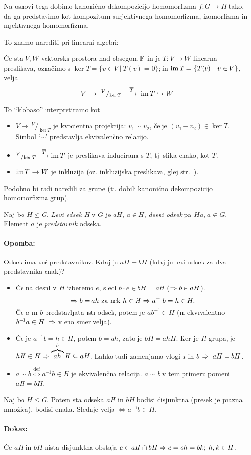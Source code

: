 \ni Na osnovi tega dobimo kanoni\v cno dekompozicijo homomorfizma $f : G \to H$ tako, da ga predstavimo kot kompozitum surjektivnega homomorfizma, izomorfizma
in injektivnega homomorfizma.

\ni To znamo narediti pri linearni algebri:
\begin{trditev}
	\v Ce sta $V, W$ vektorska prostora nad obsegom $\mathbb{F}$ in je $T : V\to W$ linearna preslikava, ozna\v cimo s $\ker T = \{v \in V\ |\ T(v) = 0\}$; in
	$\operatorname{im} T = \{T(v)\ |\ v\in V\}$, velja
	\[
		V\ \to\ ^V/_{\ker T}\ \stackrel{\overline{T}}{\longrightarrow}\ \im T \hookrightarrow W
	\]
\end{trditev}

To "`klobaso"' interpretiramo kot
\begin{itemize}
	\item{$V \to\ ^V/_{\ker T}$ je kvocientna projekcija: $v_1 \sim v_2$, \v ce je $(v_1 - v_2) \in \ker T$. Simbol `$\sim$' predstavlja ekvivalen\v cno relacijo.}
	\item{$^V/_{\ker T} \stackrel{\overline{T}}{\longrightarrow} \operatorname{im} T$ je preslikava inducirana s $T$, tj. slika enako, kot $T$.}
	\item{$\operatorname{im} T \hookrightarrow W$ je inkluzija (oz. inkluzijska preslikava, glej str.~\pageref{inkluzija}).}
\end{itemize}

Podobno bi radi naredili za grupe (tj. dobili kanoni\v cno dekompozicijo homomorfizma grup).

\pagebreak
\begin{defin}
	Naj bo $H \leq G$. \emph{Levi odsek} $H$ v $G$ je $aH$, $a \in H$, \emph{desni odsek} pa $Ha$, $a \in G$. Element $a$ je \emph{predstavnik} odseka.
\end{defin}

\paragraph{Opomba:} Odsek ima ve\v c predstavnikov. Kdaj je $aH = bH$ (kdaj je levi odsek za dva predstavnika enak)?
\begin{itemize}
	\item{\v Ce na desni v $H$ izberemo $e$, sledi $b\cdot e \in bH = aH$ ($\Rightarrow b \in aH$).
		\[
			\Rightarrow b = ah\ \text{za nek}\ h \in H \Rightarrow a^{-1}b = h \in H.
		\]
		\v Ce $a$ in $b$ predstavljata isti odsek, potem je $ab^{-1} \in H$ (in ekvivalentno $b^{-1}a \in H\ \Rightarrow$ v eno smer velja).}
	\item{\v Ce je $a^{-1}b = h \in H$, potem $b = ah$, zato je $bH = ahH$. Ker je $H$ grupa, je $hH \in H \Rightarrow \overbrace{ah}^b H \subseteq aH$. Lahko tudi
		zamenjamo vlogi $a$ in $b$ $\Rightarrow\ aH = bH$.}
	\item{$a \sim b \stackrel{\text{def}}{\iff} a^{-1}b \in H$ je ekvivalen\v cna relacija. $a \sim b$ v tem primeru pomeni $aH = bH$.}
\end{itemize}

\begin{trditev}
	Naj bo $H \leq G$. Potem sta odseka $aH$ in $bH$ bodisi disjunktna (presek je prazna mno\v zica), bodisi enaka. Slednje velja $\iff a^{-1}b \in H$.
\end{trditev}

\paragraph{Dokaz:}
\v Ce $aH$ in $bH$ nista disjunktna obstaja $c \in aH \cap bH \Rightarrow c = ah = bk;\ h,k \in H$.

